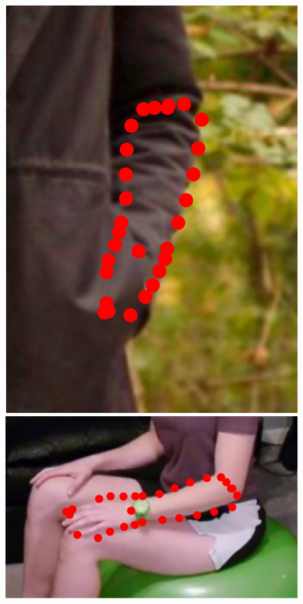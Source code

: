 \begin{figure}[!t]
    \newcommand{\ofh}{0.24\columnwidth}
    \centering
    \includegraphics[height=\ofh]{Suplementory_Meterial/ExFit/0001.eps}
    \hfill
    \includegraphics[height=\ofh]{Suplementory_Meterial/ExFit/0002.eps}

\end{figure}
